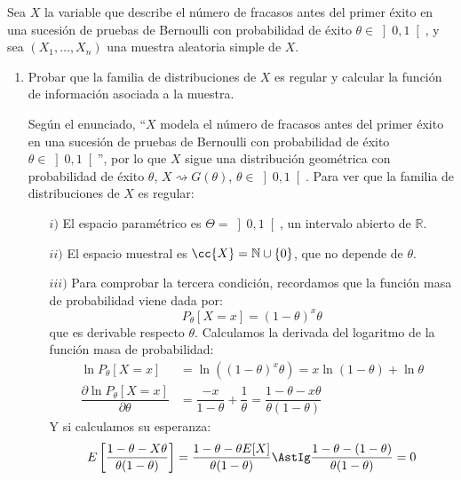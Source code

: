 \begin{ejercicio}
    Sea $X$ la variable que describe el número de fracasos antes del primer éxito en una sucesión de pruebas de Bernoulli con probabilidad de éxito $\theta\in \left]0,1\right[$, y sea $(X_1, \ldots, X_n)$ una muestra aleatoria simple de $X$.
    \begin{enumerate}[label=\alph*)]
        \item Probar que la familia de distribuciones de $X$ es regular y calcular la función de información asociada a la muestra.

            Según el enunciado, ``$X$ modela el número de fracasos antes del primer éxito en una sucesión de pruebas de Bernoulli con probabilidad de éxito $\theta\in \left]0,1\right[$'', por lo que $X$ sigue una distribución geométrica con probabilidad de éxito $\theta$, $X\rightsquigarrow G(\theta)$, $\theta \in \left]0,1\right[$. Para ver que la familia de distribuciones de $X$ es regular:
            \begin{enumerate}
                \item[$i)$] El espacio paramétrico es $\Theta = \left]0,1\right[$, un intervalo abierto de $\mathbb{R}$.
                \item[$ii)$] El espacio muestral es $\cc{X}=\mathbb{N}\cup \{0\}$, que no depende de $\theta$.
                \item[$iii)$] Para comprobar la tercera condición, recordamos que la función masa de probabilidad viene dada por:
                    \begin{equation*}
                        P_\theta[X=x] = {(1-\theta)}^{x}\theta
                    \end{equation*}
                    que es derivable respecto $\theta$. Calculamos la derivada del logaritmo de la función masa de probabilidad:
                    \begin{align*}
                        \ln P_\theta[X=x] &= \ln\left({(1-\theta)}^{x}\theta\right) = x\ln(1-\theta) + \ln\theta \\
                        \dfrac{\partial \ln P_\theta[X=x]}{\partial \theta} &= \dfrac{-x}{1-\theta} + \dfrac{1}{\theta} = \dfrac{1-\theta - x\theta}{\theta(1-\theta)} 
                    \end{align*}
                    Y si calculamos su esperanza:
                    \begin{equation*} 
                        E\left[\dfrac{1-\theta - X\theta}{\theta(1-\theta)} \right] = \dfrac{1-\theta - \theta E[X]}{\theta(1-\theta)} \AstIg \dfrac{1-\theta - (1-\theta)}{\theta(1-\theta)} = 0

\end{equation*}
\end{enumerate}
\end{enumerate}
\end{ejercicio}
